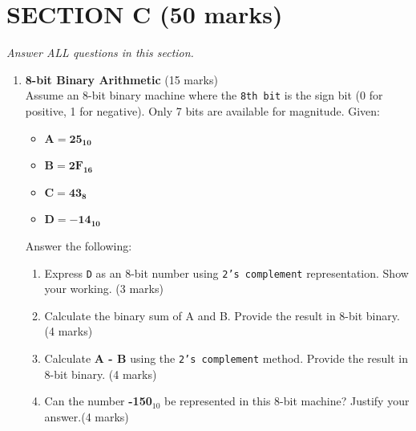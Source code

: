 \documentclass[12pt]{article}
\begin{document}
\newpage

\section*{SECTION C (50 marks)}
\textit{Answer ALL questions in this section.}

\begin{enumerate}[left=0pt, label=\bfseries Q\arabic*.]
    \item \textbf{8-bit Binary Arithmetic} \hfill (15 marks) \\
    Assume an 8-bit binary machine where the \texttt{8th bit} is the sign bit (0 for positive, 1 for negative). Only 7 bits are available for magnitude.
    Given:
    \begin{itemize}
        \item $\mathbf{A = 25_{10}}$
        \item $\mathbf{B = 2F_{16}}$
        \item $\mathbf{C = 43_{8}}$
        \item $\mathbf{D = -14_{10}}$
    \end{itemize}
    Answer the following:
    \begin{enumerate}[label=(\alph*)]
        \item Express \texttt{D} as an 8-bit number using \texttt{2's complement} representation. Show your working. \hfill (3 marks)
        \item Calculate the binary sum of A and B. Provide the result in 8-bit binary. \hfill (4 marks)
        \item Calculate \textbf{A - B} using the \texttt{2's complement} method. Provide the result in 8-bit binary. \hfill (4 marks)
        \item Can the number \textbf{-150$_{10}$} be represented in this 8-bit machine? Justify your answer.\hfill (4 marks)
    \end{enumerate}


\end{enumerate}
\end{document}
